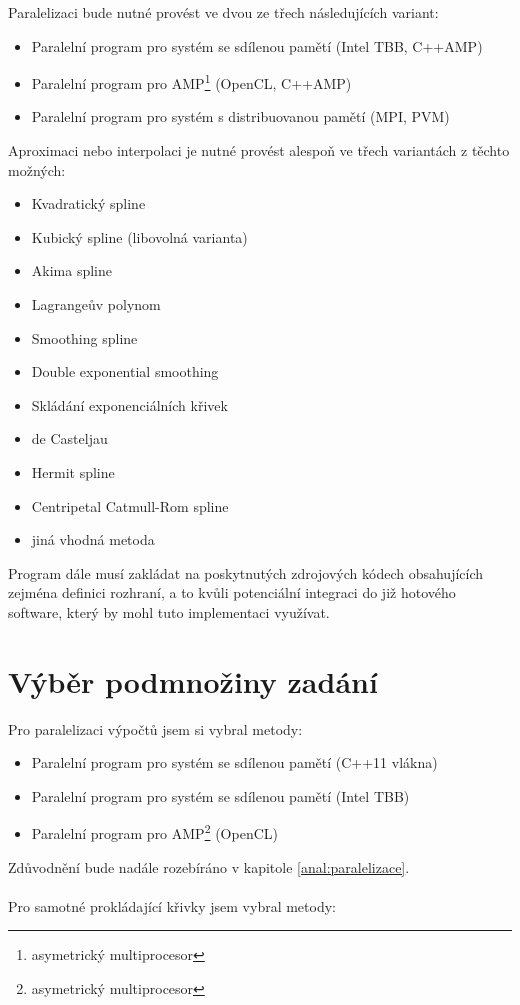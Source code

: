 \documentclass[]{thesiskiv}
\begin{document}
Paralelizaci bude nutné provést ve dvou ze třech následujících variant:
\begin{itemize}[noitemsep]
	\item Paralelní program pro systém se sdílenou pamětí (Intel TBB, C++AMP)
	\item Paralelní program pro AMP\footnote{asymetrický multiprocesor} (OpenCL, C++AMP)
	\item Paralelní program pro systém s distribuovanou pamětí (MPI, PVM)
\end{itemize}

Aproximaci nebo interpolaci je nutné provést alespoň ve třech variantách z těchto možných:
\begin{itemize}[noitemsep]
	\item Kvadratický spline
	\item Kubický spline (libovolná varianta)
	\item Akima spline
	\item Lagrangeův polynom
	\item Smoothing spline
	\item Double exponential smoothing
	\item Skládání exponenciálních křivek
	\item de Casteljau
	\item Hermit spline
	\item Centripetal Catmull-Rom spline
	\item jiná vhodná metoda
\end{itemize}

Program dále musí zakládat na poskytnutých zdrojových kódech obsahujících zejména definici rozhraní, a to kvůli potenciální integraci do již hotového software, který by mohl tuto implementaci využívat.

\section{Výběr podmnožiny zadání}

Pro paralelizaci výpočtů jsem si vybral metody:

\begin{itemize}[noitemsep]
	\item Paralelní program pro systém se sdílenou pamětí (C++11 vlákna)
	\item Paralelní program pro systém se sdílenou pamětí (Intel TBB)
	\item Paralelní program pro AMP\footnote{asymetrický multiprocesor} (OpenCL)
\end{itemize}
Zdůvodnění bude nadále rozebíráno v kapitole \ref{anal:paralelizace}.\\
\\
Pro samotné prokládající křivky jsem vybral metody:
\end{document}
